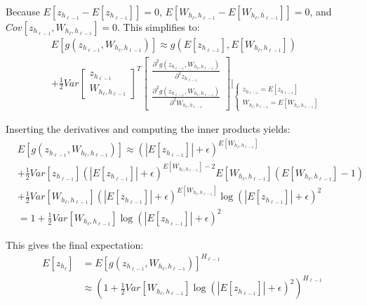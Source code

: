 Because $E[z_{h_{\ell-1}} - E[z_{h_{\ell-1}}]] = 0$, $E[W_{h_{\ell}, h_{\ell-1}} - E[W_{h_{\ell}, h_{\ell-1}}]] = 0$, and $Cov[z_{h_{\ell-1}}, W_{h_{\ell}, h_{\ell-1}}] = 0$. This simplifies to:
\begin{equation}
\begin{aligned}
&E[g(z_{h_{\ell-1}}, W_{h_{\ell}, h_{\ell-1}})] \approx
g(E[z_{h_{\ell-1}}], E[W_{h_{\ell}, h_{\ell-1}}])\\
&+ \frac{1}{2} Var\begin{bmatrix}
z_{h_{\ell-1}} \\ W_{h_{\ell}, h_{\ell-1}}
\end{bmatrix}^T \begin{bmatrix}
\frac{\partial^2 g(z_{h_{\ell-1}}, W_{h_{\ell}, h_{\ell-1}})}{\partial^2 z_{h_{\ell-1}}} \\
\frac{\partial^2 g(z_{h_{\ell-1}}, W_{h_{\ell}, h_{\ell-1}})}{\partial^2 W_{h_{\ell}, h_{\ell-1}}}
\end{bmatrix} \Bigg\rvert_{
\begin{cases}
z_{h_{\ell-1}} = E[z_{h_{\ell-1}}] \\
W_{h_{\ell}, h_{\ell-1}} = E[W_{h_{\ell}, h_{\ell-1}}]
\end{cases}
}
\end{aligned}
\end{equation}

Inserting the derivatives and computing the inner products yields:
\begin{equation}
\begin{aligned}
&E[g(z_{h_{\ell-1}}, W_{h_{\ell}, h_{\ell-1}})] \approx
(|E[z_{h_{\ell-1}}]| + \epsilon)^{E[W_{h_{\ell}, h_{\ell-1}}]} \\
&+ \frac{1}{2} Var[z_{h_{\ell-1}}] (|E[z_{h_{\ell-1}}]| + \epsilon)^{E[W_{h_{\ell}, h_{\ell-1}}] - 2} E[W_{h_{\ell}, h_{\ell-1}}] (E[W_{h_{\ell}, h_{\ell-1}}] - 1) \\
&+ \frac{1}{2} Var[W_{h_{\ell}, h_{\ell-1}}] (|E[z_{h_{\ell-1}}]| + \epsilon)^{E[W_{h_{\ell}, h_{\ell-1}}]} \log(|E[z_{h_{\ell-1}}]| + \epsilon)^2 \\
&=1 + \frac{1}{2} Var[W_{h_{\ell}, h_{\ell-1}}] \log(|E[z_{h_{\ell-1}}]| + \epsilon)^2
\end{aligned}
\end{equation}

This gives the final expectation:
\begin{equation}
\begin{aligned}
E[z_{h_\ell}] &= E\left[g(z_{h_{\ell-1}}, W_{h_{\ell}, h_{\ell-1}})\right]^{H_{\ell-1}} \\
&\approx\left(1 + \frac{1}{2} Var[W_{h_{\ell}, h_{\ell-1}}] \log(|E[z_{h_{\ell-1}}]| + \epsilon)^2\right)^{H_{\ell-1}}
\end{aligned}
\end{equation}

